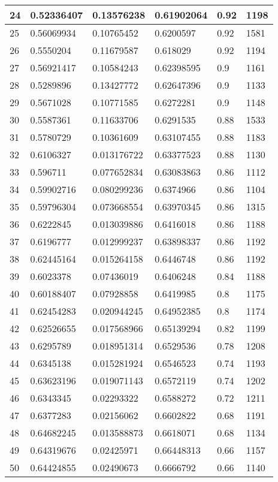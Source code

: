 \begin{longtable}{|l|l|l|l|l|l|}
24 & 0.52336407 & 0.13576238 & 0.61902064 & 0.92 & 1198 \\ \hline 
25 & 0.56069934 & 0.10765452 & 0.6200597 & 0.92 & 1581 \\ \hline 
26 & 0.5550204 & 0.11679587 & 0.618029 & 0.92 & 1194 \\ \hline 
27 & 0.56921417 & 0.10584243 & 0.62398595 & 0.9 & 1161 \\ \hline 
28 & 0.5289896 & 0.13427772 & 0.62647396 & 0.9 & 1133 \\ \hline 
29 & 0.5671028 & 0.10771585 & 0.6272281 & 0.9 & 1148 \\ \hline 
30 & 0.5587361 & 0.11633706 & 0.6291535 & 0.88 & 1533 \\ \hline 
31 & 0.5780729 & 0.10361609 & 0.63107455 & 0.88 & 1183 \\ \hline 
32 & 0.6106327 & 0.013176722 & 0.63377523 & 0.88 & 1130 \\ \hline 
33 & 0.596711 & 0.077652834 & 0.63083863 & 0.86 & 1112 \\ \hline 
34 & 0.59902716 & 0.080299236 & 0.6374966 & 0.86 & 1104 \\ \hline 
35 & 0.59796304 & 0.073668554 & 0.63970345 & 0.86 & 1315 \\ \hline 
36 & 0.6222845 & 0.013039886 & 0.6416018 & 0.86 & 1188 \\ \hline 
37 & 0.6196777 & 0.012999237 & 0.63898337 & 0.86 & 1192 \\ \hline 
38 & 0.62445164 & 0.015264158 & 0.6446748 & 0.86 & 1192 \\ \hline 
39 & 0.6023378 & 0.07436019 & 0.6406248 & 0.84 & 1188 \\ \hline 
40 & 0.60188407 & 0.07928858 & 0.6419985 & 0.8 & 1175 \\ \hline 
41 & 0.62454283 & 0.020944245 & 0.64952385 & 0.8 & 1174 \\ \hline 
42 & 0.62526655 & 0.017568966 & 0.65139294 & 0.82 & 1199 \\ \hline 
43 & 0.6295789 & 0.018951314 & 0.6529536 & 0.78 & 1208 \\ \hline 
44 & 0.6345138 & 0.015281924 & 0.6546523 & 0.74 & 1193 \\ \hline 
45 & 0.63623196 & 0.019071143 & 0.6572119 & 0.74 & 1202 \\ \hline 
46 & 0.6343345 & 0.02293322 & 0.6588272 & 0.72 & 1211 \\ \hline 
47 & 0.6377283 & 0.02156062 & 0.6602822 & 0.68 & 1191 \\ \hline 
48 & 0.64682245 & 0.013588873 & 0.6618071 & 0.68 & 1134 \\ \hline 
49 & 0.64319676 & 0.02425971 & 0.66448313 & 0.66 & 1157 \\ \hline 
50 & 0.64424855 & 0.02490673 & 0.6666792 & 0.66 & 1140 \\ \hline 
\end{longtable}